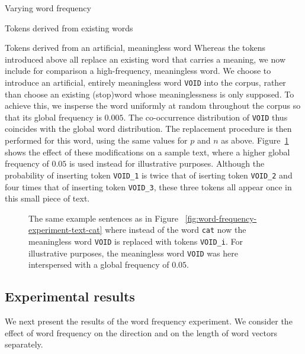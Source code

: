 \documentclass{article} %
\newcommand{\word}[1]{\texttt{#1}}
\begin{document}
\begin{section}{Varying word frequency}
\begin{subsection}{Tokens derived from existing words}
\end{subsection}

\begin{subsection}{Tokens derived from an artificial, meaningless word}\label{WFVEmeaningless}
%
Whereas the tokens introduced above all replace an existing word that
carries a meaning, we now include for comparison a high-frequency,
meaningless word.  We choose to introduce an artificial, entirely
meaningless word \word{VOID} into the corpus, rather than choose an
existing (stop)word whose meaninglessness is only supposed.  To achieve
this, we insperse the word uniformly at random throughout the corpus so
that its global frequency is $0.005$.  The co-occurrence
distribution of \word{VOID} thus coincides with the global word
distribution.  The replacement procedure is then performed for this
word, using the same values for $p$ and $n$ as above.
Figure~\ref{fig:word-frequency-experiment-text-void} shows the effect of
these modifications on a sample text, where a higher global frequency of $0.05$ is used instead
for illustrative purposes.  Although the probability of inserting token
\word{VOID\_1} is twice that of iserting token \word{VOID\_2} and four
times that of inserting token \word{VOID\_3}, these three tokens all
appear once in this small piece of text.

\begin{figure}
	\begin{mdframed}
	
	\end{mdframed}
	\caption{The same example sentences as in
          Figure ~\ref{fig:word-frequency-experiment-text-cat} where
          instead of the word \word{cat} now the meaningless word
          \word{VOID} is replaced with tokens \word{VOID\_i}.  For
          illustrative purposes, the meaningless word \word{VOID} was
          here interspersed with a global frequency of $0.05$.}
	\label{fig:word-frequency-experiment-text-void}
\end{figure}
\end{subsection}

\subsection{Experimental results}
We next present the results of the word frequency experiment. We
consider the effect of word frequency on the direction and on the length
of word vectors separately.


\end{section}
\end{document}
